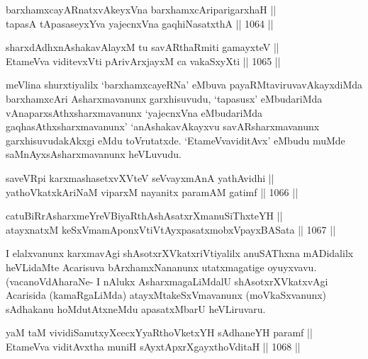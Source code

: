 
\begin{shl}
barxhamxcayARnatxvAkeyxVna barxhamxcAriparigarxhaH || \\
tapasA tApasaseyxYva yajecnxVna gaqhiNasatxthA \hfill || 1064 ||  
\end{shl}
				
\begin{shl}
sharxdAdhxnAshakavAlayxM tu savARthaRmiti gamayxteV ||  \\
EtameVva viditevxVti pArivArxjayxM ca vakaSxyXti \hfill || 1065 ||  
\end{shl}

\begin{artha}
meVlina shurxtiyalilx `barxhamxcayeRNa' eMbuva payaRMtaviruvavAkayxdiMda barxhamxcAri Asharxmavanunx garxhisuvudu, `tapasusx' eMbudariMda vAnaparxsAthxsharxmavanunx `yajecnxVna eMbudariMda gaqhasAthxsharxmavanunx' `anAshakavAkayxvu savARsharxmavanunx garxhisuvudakAkxgi eMdu toVrutatxde. `EtameVvaviditAvx' eMbudu muMde saMnAyxsAsharxmavanunx heVLuvudu.
\end{artha}


\begin{shl}
saveVR\s pi karxmashasetxvXVteV seVvayxmAnA yathAvidhi || \\
yathoVkatxkAriNaM viparxM nayanitx paramAM gatimf \hfill || 1066 ||  
\end{shl}
				
\begin{shl}
catuBiRrAsharxmeYreVBiyaRthAshAsatxrXmanuSiThxteYH || \\
atayxnatxM keSxVmamAponxVtiVtAyxpasatxmobxV\s payxBASata \hfill || 1067 ||  
\end{shl}

\begin{artha}
I elalxvanunx karxmavAgi shAsotxrXVkatxriVtiyalilx anuSAThxna mADidalilx heVLidaMte Acarisuva bArxhamxNananunx utatxmagatige oyuyxvavu. (vacanoVdAharaNe- I nAlukx AsharxmagaLiMdalU shAsotxrXVkatxvAgi Acarisida (kamaRgaLiMda) atayxMtakeSxVmavanunx (moVkaSxvanunx) sAdhakanu hoMdutAtxneMdu apasatxMbarU heVLiruvaru.
\end{artha}


\begin{shl}
yaM taM vividiSanutxyXcecxYyaRthoVketxYH sAdhaneYH paramf || \\
EtameVva viditAvx\s tha muniH sAyxtApxrXgayxthoVditaH \hfill || 1068 || 
\end{shl}

